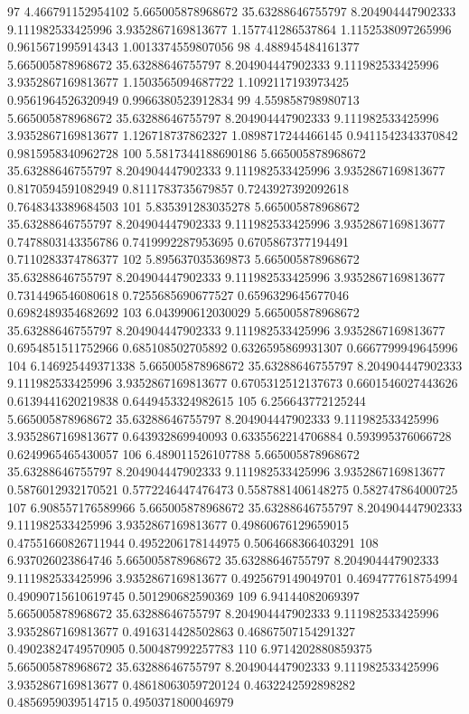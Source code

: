 {97 4.466791152954102 5.665005878968672 35.63288646755797 8.204904447902333 9.111982533425996 3.9352867169813677 1.157741286537864 1.1152538097265996 0.9615671995914343 1.0013374559807056
98 4.488945484161377 5.665005878968672 35.63288646755797 8.204904447902333 9.111982533425996 3.9352867169813677 1.1503565094687722 1.1092117193973425 0.9561964526320949 0.9966380523912834
99 4.559858798980713 5.665005878968672 35.63288646755797 8.204904447902333 9.111982533425996 3.9352867169813677 1.126718737862327 1.0898717244466145 0.9411542343370842 0.9815958340962728
100 5.5817344188690186 5.665005878968672 35.63288646755797 8.204904447902333 9.111982533425996 3.9352867169813677 0.8170594591082949 0.8111783735679857 0.7243927392092618 0.7648343389684503
101 5.835391283035278 5.665005878968672 35.63288646755797 8.204904447902333 9.111982533425996 3.9352867169813677 0.7478803143356786 0.7419992287953695 0.6705867377194491 0.7110283374786377
102 5.895637035369873 5.665005878968672 35.63288646755797 8.204904447902333 9.111982533425996 3.9352867169813677 0.7314496546080618 0.7255685690677527 0.6596329645677046 0.6982489354682692
103 6.043990612030029 5.665005878968672 35.63288646755797 8.204904447902333 9.111982533425996 3.9352867169813677 0.6954851511752966 0.685108502705892 0.6326595869931307 0.6667799949645996
104 6.146925449371338 5.665005878968672 35.63288646755797 8.204904447902333 9.111982533425996 3.9352867169813677 0.6705312512137673 0.6601546027443626 0.6139441620219838 0.6449453324982615
105 6.256643772125244 5.665005878968672 35.63288646755797 8.204904447902333 9.111982533425996 3.9352867169813677 0.643932869940093 0.6335562214706884 0.593995376066728 0.6249965465430057
106 6.489011526107788 5.665005878968672 35.63288646755797 8.204904447902333 9.111982533425996 3.9352867169813677 0.5876012932170521 0.5772246447476473 0.5587881406148275 0.582747864000725
107 6.908557176589966 5.665005878968672 35.63288646755797 8.204904447902333 9.111982533425996 3.9352867169813677 0.49860676129659015 0.47551660826711944 0.4952206178144975 0.5064668366403291
108 6.937026023864746 5.665005878968672 35.63288646755797 8.204904447902333 9.111982533425996 3.9352867169813677 0.4925679149049701 0.4694777618754994 0.49090715610619745 0.501290682590369
109 6.94144082069397 5.665005878968672 35.63288646755797 8.204904447902333 9.111982533425996 3.9352867169813677 0.4916314428502863 0.46867507154291327 0.49023824749570905 0.500487992257783
110 6.9714202880859375 5.665005878968672 35.63288646755797 8.204904447902333 9.111982533425996 3.9352867169813677 0.48618063059720124 0.4632242592898282 0.4856959039514715 0.4950371800046979
}
